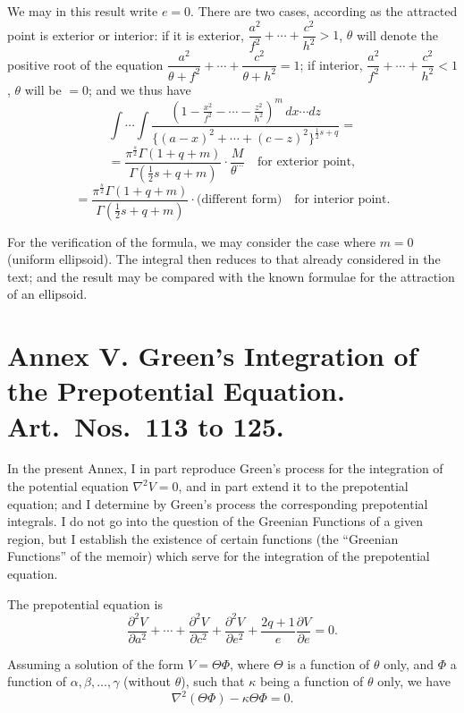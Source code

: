 \documentclass[11pt,a4paper]{book}
\begin{document}
\begin{art}\label{art:101}
We may in this result write $e = 0$. There are two cases, according as the attracted point is exterior or interior: if it is exterior, $\dfrac{a^2}{f^2} + \cdots + \dfrac{c^2}{h^2} > 1$, $\theta$ will denote the positive root of the equation $\dfrac{a^2}{\theta+f^2} + \cdots + \dfrac{c^2}{\theta+h^2} = 1$; if interior, $\dfrac{a^2}{f^2} + \cdots + \dfrac{c^2}{h^2} < 1$, $\theta$ will be $= 0$; and we thus have
\[
\int \cdots \int \frac{(1-\frac{x^2}{f^2}-\cdots-\frac{z^2}{h^2})^m \, dx \cdots dz}{\{(a-x)^2+\cdots+(c-z)^2\}^{\frac{1}{2}s+q}} =
\]
\[
= \frac{\pi^{\frac{s}{2}}\Gamma(1+q+m)}{\Gamma(\frac{1}{2}s+q+m)} \cdot \frac{M}{\theta^{\cdots}} \quad \text{for exterior point},
\]
\[
= \frac{\pi^{\frac{s}{2}}\Gamma(1+q+m)}{\Gamma(\frac{1}{2}s+q+m)} \cdot \text{(different form)} \quad \text{for interior point}.
\]
\end{art}

\begin{art}\label{art:102}
For the verification of the formula, we may consider the case where $m = 0$ (uniform ellipsoid). The integral then reduces to that already considered in the text; and the result may be compared with the known formulae for the attraction of an ellipsoid.
\end{art}

\newpage
\section*{Annex V. Green's Integration of the Prepotential Equation. Art.\ Nos.\ 113 to 125.}

\begin{art}\label{art:113}
In the present Annex, I in part reproduce Green's process for the integration of the potential equation $\nabla^2 V = 0$, and in part extend it to the prepotential equation; and I determine by Green's process the corresponding prepotential integrals. I do not go into the question of the Greenian Functions of a given region, but I establish the existence of certain functions (the ``Greenian Functions'' of the memoir) which serve for the integration of the prepotential equation.
\end{art}

\begin{art}\label{art:114}
The prepotential equation is
\[
\frac{\partial^2 V}{\partial a^2} + \cdots + \frac{\partial^2 V}{\partial c^2} + \frac{\partial^2 V}{\partial e^2} + \frac{2q+1}{e}\frac{\partial V}{\partial e} = 0.
\]

Assuming a solution of the form $V = \Theta \Phi$, where $\Theta$ is a function of $\theta$ only, and $\Phi$ a function of $\alpha, \beta, \ldots, \gamma$ (without $\theta$), such that $\kappa$ being a function of $\theta$ only, we have
\[
\nabla^2 (\Theta\Phi) - \kappa\Theta\Phi = 0.
\]
\end{art}
\end{document}
